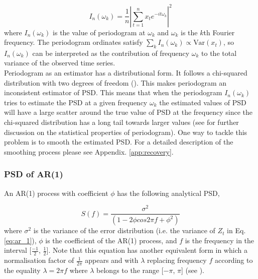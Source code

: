 \documentclass{aa}
\begin{document}
\begin{equation}
I_n(\omega_k) = \frac{1}{n}\left|\sum_{t = 1}^{n} x_te^{-it\omega_k}\right|^2
\end{equation}
where $I_n(\omega_k)$ is the value of periodogram at $\omega_k$ and $\omega_k$ is the $k$th Fourier frequency. The periodogram ordinates satisfy $\sum_k I_n(\omega_k) \propto \text{Var}(x_t)$, so $I_n(\omega_k)$ can be interpreted as the contribution of frequency $\omega_k$ to the total variance of the observed time series. \\
Periodogram as an estimator has a distributional form. It follows a chi-squared distribution with two degrees of freedom (\citealt{Vaughan2003}). This makes periodogram an inconsistent estimator of PSD. This means that when the periodogram $I_n(\omega_k)$ tries to estimate the PSD at a given frequency $\omega_k$ the estimated values of PSD will have a large scatter around the true value of PSD at the frequency since the chi-squared distribution has a long tail towards larger values (see \citet{Vaughan2003} for further discussion on the statistical properties of periodogram). One way to tackle this problem is to smooth the estimated PSD. For a detailed description of the smoothing process please see Appendix. \ref{app:recovery}. \\

\subsubsection{PSD of AR(1)}
An AR(1) process with coefficient $\phi$ has the following analytical PSD,

\begin{equation}
S(f) = \frac{\sigma^2}{(1 - 2\phi cos2\pi f + \phi^2)}
\end{equation}
where $\sigma^2$ is the variance of the error distribution (i.e. the variance of $Z_t$ in Eq. \ref{eq:ar_1}), $\phi$ is the coefficient of the AR(1) process, and $f$ is the frequency in the interval [$\frac{-1}{2}$, $\frac{1}{2}$]. Note that this equation has another equivalent form in which a normalisation factor of $\frac{1}{2\pi}$ appears and with $\lambda$ replacing frequency $f$ according to the equality $\lambda = 2\pi f$ where $\lambda$ belongs to the range [$-\pi$, $\pi$] (see \citealt{BrockwellDavis2002}). \\
\end{document}
